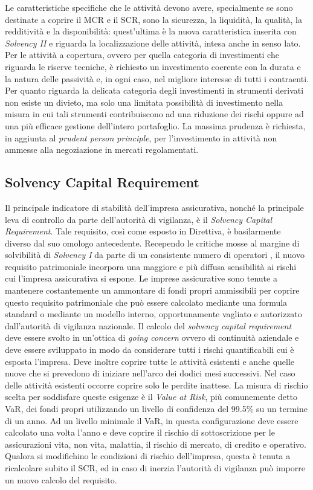 Le caratteristiche specifiche che le attività devono avere, specialmente se sono destinate a coprire il MCR e il SCR, sono la sicurezza, la liquidità, la qualità, la redditività e la disponibilità: quest’ultima è la nuova caratteristica inserita con \textit{\textit{Solvency I}I} e riguarda la localizzazione delle attività, intesa anche in senso lato.
Per le attività a copertura, ovvero per quella categoria di investimenti che riguarda le riserve tecniche, è richiesto un investimento coerente con la durata e la natura delle passività e, in ogni caso, nel migliore interesse di tutti i contraenti.
Per quanto riguarda la delicata categoria degli investimenti in strumenti derivati non esiste un divieto, ma solo una limitata possibilità di investimento nella misura in cui tali strumenti contribuiscono ad una riduzione dei rischi oppure ad una più efficace gestione dell’intero portafoglio.
La massima prudenza è richiesta, in aggiunta al {\itshape prudent person principle}, per l’investimento in attività non ammesse alla negoziazione in mercati regolamentati.

\subsection{Solvency Capital Requirement} 
\label{subs:SCR}
Il principale indicatore di stabilità dell’impresa assicurativa, nonché la principale leva di controllo da parte dell’autorità di vigilanza, è il {\itshape Solvency Capital Requirement}. Tale requisito, così come esposto in Direttiva, è basilarmente diverso dal suo omologo antecedente. Recependo le critiche mosse al margine di solvibilità di \textit{Solvency I} da parte di un consistente numero di operatori \cite{nicelliania}, il nuovo requisito patrimoniale incorpora una maggiore e più diffusa sensibilità ai rischi cui l’impresa assicurativa si espone.
Le imprese assicurative sono tenute a mantenere costantemente un ammontare di fondi propri ammissibili per coprire questo requisito patrimoniale che può essere calcolato mediante una formula standard o mediante un modello interno, opportunamente vagliato e autorizzato dall’autorità di vigilanza nazionale.
Il calcolo del {\itshape solvency capital requirement} deve essere svolto in un’ottica di {\itshape going concern} ovvero di continuità aziendale e deve essere sviluppato in modo da considerare tutti i rischi quantificabili cui è esposta l’impresa. Deve inoltre coprire tutte le attività esistenti e anche quelle nuove che si prevedono di iniziare nell’arco dei dodici mesi successivi. Nel caso delle attività esistenti occorre coprire solo le perdite inattese.
La misura di rischio scelta per soddisfare queste esigenze è il {\itshape Value at Risk}, più comunemente detto VaR, dei fondi propri utilizzando un livello di confidenza del 99.5\% su un termine di un anno. 
Ad un livello minimale il VaR, in questa configurazione deve essere calcolato una volta l’anno e deve coprire il rischio di sottoscrizione per le assicurazioni vita, non vita, malattia, il rischio di mercato, di credito e operativo. Qualora si modifichino le condizioni di rischio dell’impresa, questa è tenuta a ricalcolare subito il SCR, ed in caso di inerzia l’autorità di vigilanza può imporre un nuovo calcolo del requisito.

